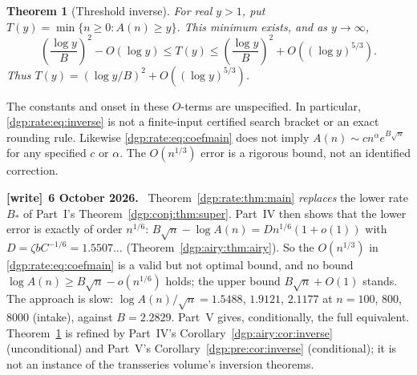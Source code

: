 \documentclass[11pt,letterpaper]{article}
\numberwithin{equation}{section}
\newtheorem{theorem}{Theorem}[section]
\theoremstyle{remark}\newtheorem{remark}[theorem]{Remark}
\newenvironment{writenote}[1][]{\par\smallskip\begingroup\small
 \noindent\textbf{[write]}\if\relax\detokenize{#1}\relax\else~\textbf{#1.}\fi\ }%
 {\par\endgroup\smallskip}
\begin{document}
\begin{theorem}[Threshold inverse]\label{dgp:rate:thm:inverse}
For real $y>1$, put $T(y)=\min\{n\geq0:A(n)\geq y\}$. This minimum
exists, and as $y\to\infty$,
\begin{equation}\label{dgp:rate:eq:inverse}
 \left(\frac{\log y}{B}\right)^2-O(\log y)
 \leq T(y)\leq
 \left(\frac{\log y}{B}\right)^2+O((\log y)^{5/3}).
\end{equation}
Thus $T(y)=(\log y/B)^2+O((\log y)^{5/3})$.
\end{theorem}

The constants and onset in these $O$-terms are unspecified. In particular,
\eqref{dgp:rate:eq:inverse} is not a finite-input certified search bracket or an
exact rounding rule. Likewise \eqref{dgp:rate:eq:coefmain} does not imply
$A(n)\sim c n^\alpha e^{B\sqrt n}$ for any specified $c$ or $\alpha$.
The $O(n^{1/3})$ error is a rigorous bound, not an identified correction.
\begin{writenote}[6 October 2026]
Theorem~\ref{dgp:rate:thm:main} \emph{replaces} the lower rate $B_*$ of Part~I's Theorem~\ref{dgp:conj:thm:super}. Part~IV then shows that the lower error is exactly of order $n^{1/6}$: $B\sqrt n-\log A(n)=Dn^{1/6}(1+o(1))$ with $D=\zeta bC^{-1/6}=1.5507\ldots$ (Theorem~\ref{dgp:airy:thm:airy}). So the $O(n^{1/3})$ in \eqref{dgp:rate:eq:coefmain} is a valid but not optimal bound, and no bound $\log A(n)\ge B\sqrt n-o(n^{1/6})$ holds; the upper bound $B\sqrt n+O(1)$ stands. The approach is slow: $\log A(n)/\sqrt n=1.5488$, $1.9121$, $2.1177$ at $n=100$, $800$, $8000$ (intake), against $B=2.2829$. Part~V gives, conditionally, the full equivalent. Theorem~\ref{dgp:rate:thm:inverse} is refined by Part~IV's Corollary~\ref{dgp:airy:cor:inverse} (unconditional) and Part~V's Corollary~\ref{dgp:pre:cor:inverse} (conditional); it is not an instance of the transseries volume's inversion theorems.
\end{writenote}
\end{document}
